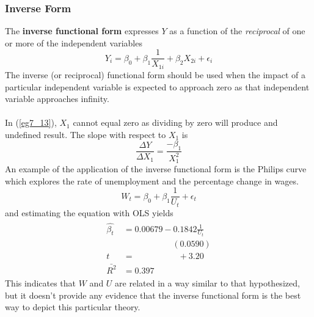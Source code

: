 \documentclass[11pt]{article}
\begin{document}
\subsubsection{Inverse Form}
The \textbf{inverse functional form} expresses $Y$ as a function of the \textit{reciprocal} of one or more of the independent variables
\begin{equation}
Y_i = \beta_0 + \beta_{1}\frac{1}{X_{1i}} + \beta_2X_{2i} + \epsilon_i \label{eg7_13}
\end{equation} 
The inverse (or reciprocal) functional form should be used when the impact of a particular independent variable is expected to approach zero as that independent variable approaches infinity.\\ \\
In (\ref{eg7_13}), $X_1$ cannot equal zero as dividing by zero will produce and undefined result. The slope with respect to $X_1$ is
\begin{equation}
\frac{\Delta Y}{\Delta X_1} = \frac{-\beta_1}{X_1^2} \label{eg7_14}
\end{equation}
An example of the application of the inverse functional form is the Philips curve which explores the rate of unemployment and the percentage change in wages. 
\begin{equation}
W_t = \beta_0 + \beta_1 \frac1{U_t} + \epsilon_t \label{eg7_15}
\end{equation}
and estimating the equation with OLS yields
\begin{align}
\label{eg7_16}
\begin{split}
\hat{\beta_t} &= 0.00679 - {0.1842 \frac1{U_t}} \\
&\>\>\>\>\>\>\>\>\>\>\>\>\>\>\>\>\>\>\>\>\>\>\>\>\>\> (0.0590)\\
t&=\>\>\>\>\>\>\>\>\>\>\>\>\>\>\>\>\>\>\>\>\>\>\> +3.20\\
\bar{R^2}&= 0.397 
\end{split}
\end{align}
This indicates that $W$ and $U$ are related in a way similar to that hypothesized, but it doesn't provide any evidence that the inverse functional form is the best way to depict this particular theory.
\end{document}
